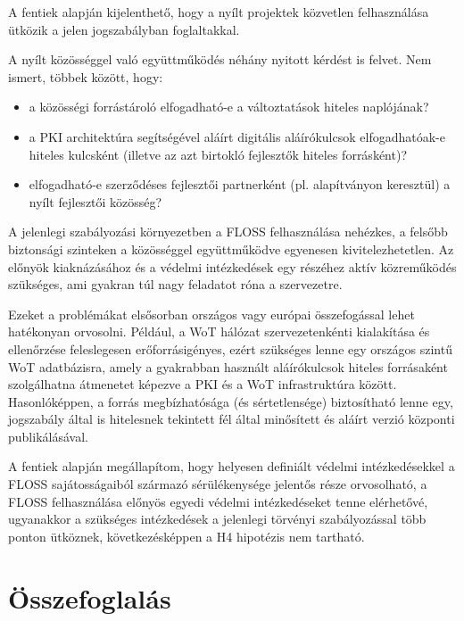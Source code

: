 \documentclass[12pt,magyar,a4paper,oneside]{scrreprt}
\providecommand{\tightlist}{%
  \setlength{\itemsep}{0pt}\setlength{\parskip}{0pt}}
\begin{document}
A fentiek alapján kijelenthető, hogy a nyílt projektek közvetlen
felhasználása ütközik a jelen jogszabályban foglaltakkal.

A nyílt közösséggel való együttműködés néhány nyitott kérdést is felvet.
Nem ismert, többek között, hogy:

\begin{itemize}
\tightlist
\item
  a közösségi forrástároló elfogadható-e a változtatások hiteles
  naplójának?
\item
  a PKI architektúra segítségével aláírt digitális aláírókulcsok
  elfogadhatóak-e hiteles kulcsként (illetve az azt birtokló fejlesztők
  hiteles forrásként)?
\item
  elfogadható-e szerződéses fejlesztői partnerként (pl. alapítványon
  keresztül) a nyílt fejlesztői közösség?
\end{itemize}

A jelenlegi szabályozási környezetben a FLOSS felhasználása nehézkes, a
felsőbb biztonsági szinteken a közösséggel együttműködve egyenesen
kivitelezhetetlen. Az előnyök kiaknázásához és a védelmi intézkedések
egy részéhez aktív közreműködés szükséges, ami gyakran túl nagy
feladatot róna a szervezetre.

Ezeket a problémákat elsősorban országos vagy európai összefogással
lehet hatékonyan orvosolni. Például, a WoT hálózat szervezetenkénti
kialakítása és ellenőrzése feleslegesen erőforrásigényes, ezért
szükséges lenne egy országos szintű WoT adatbázisra, amely a gyakrabban
használt aláírókulcsok hiteles forrásaként szolgálhatna átmenetet
képezve a PKI és a WoT infrastruktúra között. Hasonlóképpen, a forrás
megbízhatósága (és sértetlensége) biztosítható lenne egy, jogszabály
által is hitelesnek tekintett fél által minősített és aláírt verzió
központi publikálásával.

A fentiek alapján megállapítom, hogy helyesen definiált védelmi
intézkedésekkel a FLOSS sajátosságaiból származó sérülékenysége jelentős
része orvosolható, a FLOSS felhasználása előnyös egyedi védelmi
intézkedéseket tenne elérhetővé, ugyanakkor a szükséges intézkedések a
jelenlegi törvényi szabályozással több ponton ütköznek, következésképpen
a H4 hipotézis nem tartható.

\hypertarget{uxf6sszefoglaluxe1s}{%
\chapter{Összefoglalás}\label{uxf6sszefoglaluxe1s}}
\end{document}
